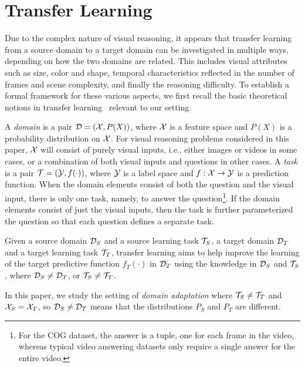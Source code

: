 \section{Transfer Learning}
\label{sec:transfer_learning}

Due to the complex nature of visual reasoning, it appears that
transfer learning from a source domain to a target domain can be investigated in
multiple ways, depending on how the two domains are related. This includes visual attributes such as size, color and shape, temporal characteristics reflected in the number of frames and scene complexity, and finally the reasoning difficulty.
To establish a formal framework for these various aspects, we first recall the basic theoretical notions in transfer learning~\cite{pan2009survey} relevant to our setting.

A \emph{domain} is a pair $\mathcal{D} = (\mathcal{X},P(X))$, where $\mathcal{X}$ is a feature space and $P(X)$ is a probability distribution on $\mathcal{X}$.
For visual reasoning problems considered in this paper,
$\mathcal{X}$ will consist of purely visual inputs, i.e., either images or videos in some cases, or
a combination of both visual inputs and questions in other cases.
A \emph{task} is a pair $\mathcal{T}= (\mathcal{Y},f(\cdot))$, where $\mathcal{Y}$ is a label space and $f: \mathcal{X} \to \mathcal{Y}$ is a prediction function.
When the domain elements consist of both the question and the visual input, there is only one task, namely, to answer the
question\footnote{%
	For the COG dataset, the answer is a tuple, one for each frame in the video, whereas typical video answering datasets only require a single answer for the entire video.}.
If the domain elements consist of just the visual inputs, then the task is further parameterized the question so that each question
defines a separate task.

\begin{definition}
	\label{defn:transfer}
	Given a source domain $\mathcal{D}_S$ and a source learning task $\mathcal{T}_S$, a target domain $\mathcal{D}_T$ and a target learning task $\mathcal{T}_T$, transfer learning aims to help improve the
	learning of the target predictive function $f_T(\cdot)$ in $\mathcal{D}_T$ using the knowledge  in $\mathcal{D}_S$ and $\mathcal{T}_S$, where $\mathcal{D}_S \ne \mathcal{D}_T$, or $\mathcal{T}_S \ne \mathcal{T}_T$.
\end{definition}
In this paper, we study the setting of \emph{domain adaptation}
where $\mathcal{T}_S \ne \mathcal{T}_T$ and $\mathcal{X}_S = \mathcal{X}_T$, so $\mathcal{D}_S \ne \mathcal{D}_T$ means that the distributions $P_S$ and $P_T$ are different.

